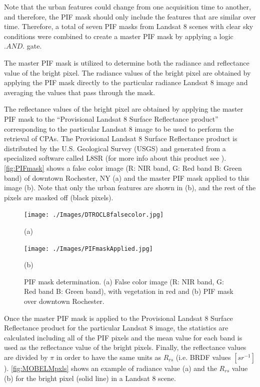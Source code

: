 \documentclass[onecolumn,3p,letterpaper]{elsarticle}
\begin{document}
Note that the urban features could change from one acquisition time to another, and therefore, the PIF mask should only include the features that are similar over time. Therefore, a total of seven PIF masks from Landsat 8 scenes with clear sky conditions were combined to create a master PIF mask by applying a logic $.AND.$ gate.

The master PIF mask is utilized to determine both the radiance and reflectance value of the bright pixel. The radiance values of the bright pixel are obtained by applying the PIF mask directly to the particular radiance Landsat 8 image and averaging the values that pass through the mask.

The reflectance values of the bright pixel are obtained by applying the master PIF mask to the ``Provisional Landsat 8 Surface Reflectance product'' corresponding to the particular Landsat 8 image to be used to perform the retrieval of CPAs. The Provisional Landsat 8 Surface Reflectance product is distributed by the U.S. Geological Survey (USGS) and generated from a specialized software called L8SR (for more info about this product see \cite{L8SurfProduct2015}). \autoref{fig:PIFmask} shows a false color image (R: NIR  band, G: Red band B: Green band) of downtown Rochester, NY (a) and the master PIF mask applied to this image (b). Note that only the urban features are shown in (b), and the rest of the pixels are masked off (black pixels).

\begin{figure}[htb]
  \begin{minipage}[c]{0.48\linewidth}
    \centering
      \texttt{[image: ./Images/DTROCL8falsecolor.jpg]}
    \centerline{(a)}\medskip
  \end{minipage}
  \hfill
  \begin{minipage}[d]{0.48\linewidth}
    \centering
      \texttt{[image: ./Images/PIFmaskApplied.jpg]}
    \centerline{(b)}\medskip
  \end{minipage}
  \caption{PIF mask determination. (a) False color image (R: NIR band, G: Red band B: Green band), with vegetation in red and (b) PIF mask over downtown Rochester. \label{fig:PIFmask} } 
\end{figure}

Once the master PIF mask is applied to the Provisional Landsat 8 Surface Reflectance product for the particular Landsat 8 image, the statistics are calculated including all of the PIF pixels and the mean value for each band is used as the reflectance value of the bright pixels. Finally, the reflectance values are divided by $\pi$ in order to have the same units as $R_{rs}$ (i.e. BRDF values $[sr^{-1}]$). \autoref{fig:MOBELMpxls} shows an example of radiance value (a) and the $R_{rs}$ value (b) for the bright pixel (solid line) in a Landsat 8 scene.
\end{document}
